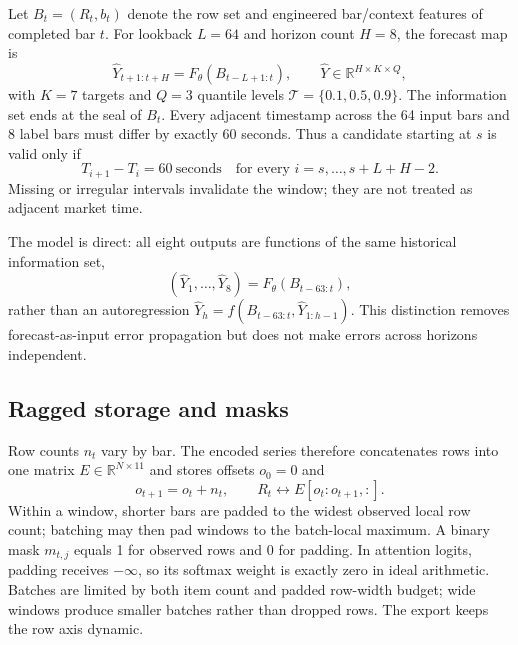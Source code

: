 \documentclass[10pt]{article}
\newcommand{\R}{\mathbb{R}}
\begin{document}
Let $B_t=(R_t,b_t)$ denote the row set and engineered bar/context features of completed bar $t$.
For lookback $L=64$ and horizon count $H=8$, the forecast map is
\begin{equation}
\widehat{Y}_{t+1:t+H}=F_\theta\!\left(B_{t-L+1:t}\right),
\qquad
\widehat{Y}\in\R^{H\times K\times Q},
\label{eq:forecast-map}
\end{equation}
with $K=7$ targets and $Q=3$ quantile levels $\mathcal T=\{0.1,0.5,0.9\}$.
The information set ends at the seal of $B_t$. Every adjacent timestamp across the 64 input bars and
8 label bars must differ by exactly 60 seconds. Thus a candidate starting at $s$ is valid only if
\begin{equation}
T_{i+1}-T_i=60\ \mathrm{seconds}\quad
\text{for every }i=s,\ldots,s+L+H-2.
\label{eq:continuity}
\end{equation}
Missing or irregular intervals invalidate the window; they are not treated as adjacent market time.

The model is direct: all eight outputs are functions of the same historical information set,
\begin{equation}
(\widehat Y_1,\ldots,\widehat Y_8)=F_\theta(B_{t-63:t}),
\end{equation}
rather than an autoregression $\widehat Y_h=f(B_{t-63:t},\widehat Y_{1:h-1})$. This distinction
removes forecast-as-input error propagation but does not make errors across horizons independent.

\subsection{Ragged storage and masks}

Row counts $n_t$ vary by bar. The encoded series therefore concatenates rows into one matrix
$E\in\R^{N\times 11}$ and stores offsets $o_0=0$ and
\begin{equation}
o_{t+1}=o_t+n_t,\qquad R_t\longleftrightarrow E[o_t:o_{t+1},:].
\label{eq:ragged-offset}
\end{equation}
Within a window, shorter bars are padded to the widest observed local row count; batching may then pad
windows to the batch-local maximum. A binary mask $m_{t,j}$ equals 1 for observed rows and 0 for
padding. In attention logits, padding receives $-\infty$, so its softmax weight is exactly zero in
ideal arithmetic. Batches are limited by both item count and padded row-width budget; wide windows
produce smaller batches rather than dropped rows. The export keeps the row axis dynamic.
\end{document}
